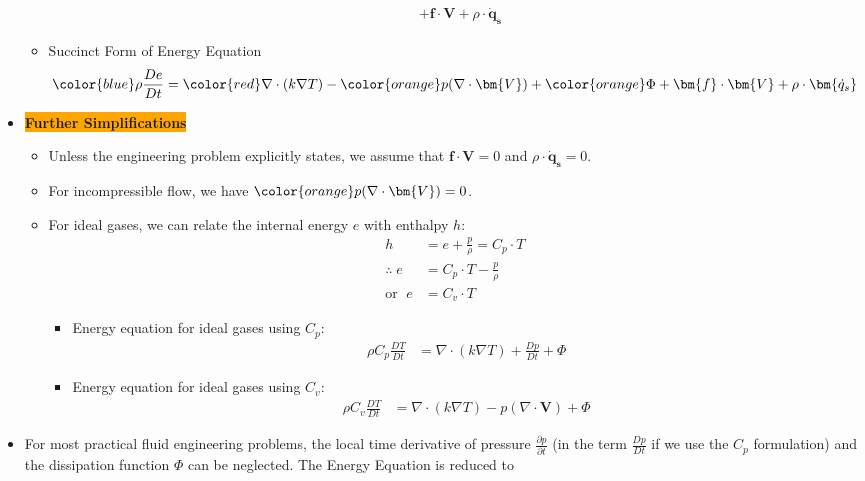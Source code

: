 \begin{itemize}
\begin{itemize}
\begin{align*}
            &+ \bm{f}\cdot \bm{V} + \rho \cdot \bm{\dot{q}_s}
        \end{align*}
        \item Succinct Form of Energy Equation
        \begin{align*}
            {\color{blue}\rho \frac{ De}{Dt}} = {\color{red}\nabla \cdot (k \nabla T)} - {\color{orange}p (\nabla \cdot \bm{V})} + {\color{orange}\Phi} + \bm{f}\cdot \bm{V} + \rho \cdot \bm{\dot{q}_s}
        \end{align*}
    \end{itemize}
    \item \colorbox{orange}{\textbf{\color{white}Further Simplifications}}
    \begin{itemize}
        \item Unless the engineering problem explicitly states, we assume that $\bm{f}\cdot \bm{V} = 0$ and $\rho \cdot \bm{\dot{q}_s} = 0$.
        \item For incompressible flow, we have ${\color{orange}p(\nabla \cdot \bm{V})}=0$.
        \item For ideal gases, we can relate the internal energy $e$ with enthalpy $h$:
        \begin{align*}
            h &= e + \frac{p}{\rho} = C_p \cdot T \\
            \therefore \; e &= C_p \cdot T - \frac{p}{\rho} \\
            \text{or } \; e &= C_v \cdot T
        \end{align*}
        \begin{itemize}
            \item Energy equation for ideal gases using $C_p$:
            \begin{align*}
                \rho C_p \frac{DT}{Dt} &= \nabla \cdot (k\nabla T) + \frac{Dp}{Dt} + \Phi
            \end{align*}
            \item Energy equation for ideal gases using $C_v$:
            \begin{align*}
                \rho C_v \frac{DT}{Dt} &= \nabla \cdot (k \nabla T) - p (\nabla \cdot \bm{V}) + \Phi
            \end{align*}
        \end{itemize}
    \end{itemize}
    \item For most practical fluid engineering problems, the local time derivative of pressure $\frac{\partial p}{\partial t}$ (in the term $\frac{Dp}{Dt}$ if we use the $C_p$ formulation) and the dissipation function $\Phi$ can be neglected. The Energy Equation is reduced to

\end{itemize}
